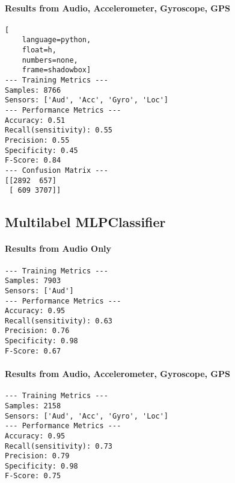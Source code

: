 \documentclass{UoNMCHA}
\numberwithin{equation}{section}
\begin{document}
\paragraph{Results from Audio, Accelerometer, Gyroscope, GPS}

\begin{lstlisting}[
    language=python,
    float=h,
    numbers=none,
    frame=shadowbox]
--- Training Metrics ---
Samples: 8766
Sensors: ['Aud', 'Acc', 'Gyro', 'Loc']
--- Performance Metrics ---
Accuracy: 0.51
Recall(sensitivity): 0.55
Precision: 0.55
Specificity: 0.45
F-Score: 0.84
--- Confusion Matrix ---
[[2892  657]
 [ 609 3707]]
\end{lstlisting}

\subsection{Multilabel MLPClassifier}


\paragraph{Results from Audio Only}
\begin{lstlisting}
--- Training Metrics ---
Samples: 7903
Sensors: ['Aud']
--- Performance Metrics ---
Accuracy: 0.95
Recall(sensitivity): 0.63
Precision: 0.76
Specificity: 0.98
F-Score: 0.67
\end{lstlisting}

\paragraph{Results from Audio, Accelerometer, Gyroscope, GPS}
\begin{lstlisting}
--- Training Metrics ---
Samples: 2158
Sensors: ['Aud', 'Acc', 'Gyro', 'Loc']
--- Performance Metrics ---
Accuracy: 0.95
Recall(sensitivity): 0.73
Precision: 0.79
Specificity: 0.98
F-Score: 0.75

\end{lstlisting}

\end{document}
